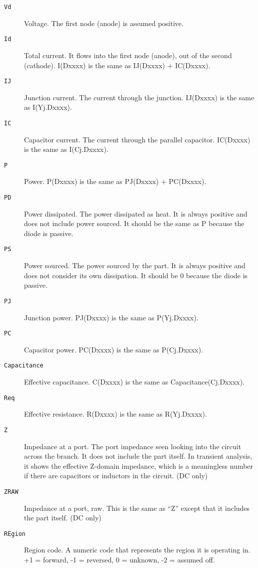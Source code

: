 \begin{description}
  
\item[{\tt Vd}] Voltage.  The first node (anode) is assumed positive.
  
\item[{\tt Id}] Total current.  It flows into the first node (anode),
  out of the second (cathode).  I(Dxxxx) is the same as IJ(Dxxxx) +
  IC(Dxxxx).
  
\item[{\tt IJ}] Junction current.  The current through the junction.
  IJ(Dxxxx) is the same as I(Yj.Dxxxx).
  
\item[{\tt IC}] Capacitor current.  The current through the parallel
  capacitor.  IC(Dxxxx) is the same as I(Cj.Dxxxx).
  
\item[{\tt P}] Power.  P(Dxxxx) is the same as PJ(Dxxxx) + PC(Dxxxx).
  
\item[{\tt PD}] Power dissipated.  The power dissipated as heat.  It
  is always positive and does not include power sourced.  It should be
  the same as P because the diode is passive.
  
\item[{\tt PS}] Power sourced.  The power sourced by the part.  It is
  always positive and does not consider its own dissipation.  It
  should be 0 because the diode is passive.
  
\item[{\tt PJ}] Junction power.  PJ(Dxxxx) is the same as P(Yj.Dxxxx).
  
\item[{\tt PC}] Capacitor power.  PC(Dxxxx) is the same as
  P(Cj.Dxxxx).
  
\item[{\tt Capacitance}] Effective capacitance.  C(Dxxxx) is the same
  as Capacitance(Cj.Dxxxx).
  
\item[{\tt Req}] Effective resistance.  R(Dxxxx) is the same as
  R(Yj.Dxxxx).
  
\item[{\tt Z}] Impedance at a port.  The port impedance seen looking
  into the circuit across the branch.  It does not include the part
  itself.  In transient analysis, it shows the effective Z-domain
  impedance, which is a meaningless number if there are capacitors or
  inductors in the circuit.  (DC only)
  
\item[{\tt ZRAW}] Impedance at a port, raw.  This is the same as ``Z''
  except that it includes the part itself. (DC only)
  
\item[{\tt REgion}] Region code.  A numeric code that represents the
  region it is operating in.  +1 = forward, -1 = reversed, 0 =
  unknown, -2 = assumed off.

\end{description}

